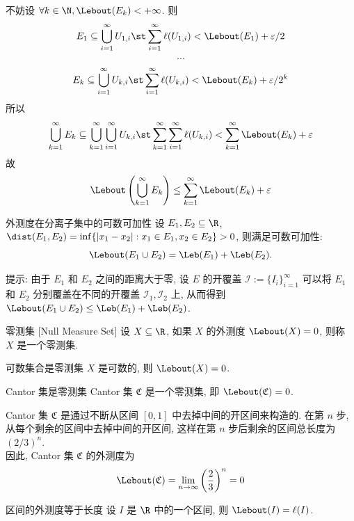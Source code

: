 \begin{prf}
    不妨设 \(\forall k \in \N, \Lebout(E_k)<+\infty\). 则
    \[E_1\subseteq\bigcup_{i=1}^{\infty}U_{1,i} \st \sum_{i=1}^{\infty} \ell(U_{1,i}) < \Lebout(E_1) + \varepsilon/2 \]
    \[\cdots\]
    \[E_k\subseteq\bigcup_{i=1}^{\infty}U_{k,i} \st \sum_{i=1}^{\infty} \ell(U_{k,i}) < \Lebout(E_k) + \varepsilon/2^k \]
    所以
    \[\bigcup_{k=1}^{\infty}E_k \subseteq \bigcup_{k=1}^{\infty}\bigcup_{i=1}^{\infty}U_{k,i} \st \sum_{k=1}^{\infty}\sum_{i=1}^{\infty} \ell(U_{k,i}) < \sum_{k=1}^{\infty} \Lebout(E_k) + \varepsilon\]
    故
    \[\Lebout\left(\bigcup_{k=1}^{\infty}E_k\right) \leq \sum_{k=1}^{\infty} \Lebout(E_k) + \varepsilon\]
\end{prf}
\begin{crl}
    {外测度在分离子集中的可数可加性}
    设 \(E_1,E_2\subseteq\R\), \(\dist(E_1,E_2)=\inf\{|x_1-x_2|:x_1\in E_1,x_2\in E_2\}>0\), 则满足可数可加性: 
    \[\Lebout(E_1\cup E_2)=\Leb(E_1)+\Leb(E_2).\]
\end{crl}
\begin{prf}
    提示: 由于 \(E_1\) 和 \(E_2\) 之间的距离大于零, 设 \(E\) 的开覆盖 \(\mathcal{I}:=\{I_i\}_{i=1}^\infty\) 可以将 \(E_1\) 和 \(E_2\) 分别覆盖在不同的开覆盖 \(\mathcal{I}_1,\mathcal{I}_2\) 上, 从而得到 \(\Lebout(E_1\cup E_2)\leq\Leb(E_1)+\Leb(E_2)\).
\end{prf}
\begin{dfn}
    {零测集}
    [Null Measure Set]
    设 \(X\subseteq\R\), 如果 \(X\) 的外测度 \(\Lebout(X)=0\), 则称 \(X\) 是一个零测集.
\end{dfn}
\begin{ppt}
    {可数集合是零测集}
    \(X\) 是可数的, 则 \(\Lebout(X)=0\).
\end{ppt}
\begin{ins}
    {Cantor 集是零测集}
    Cantor 集 \(\mathfrak{C}\) 是一个零测集, 即 \(\Lebout(\mathfrak{C})=0\).
\end{ins}
\begin{prf}
    Cantor 集 \(\mathfrak{C}\) 是通过不断从区间 \([0,1]\) 中去掉中间的开区间来构造的. 在第 \(n\) 步, 从每个剩余的区间中去掉中间的开区间, 这样在第 \(n\) 步后剩余的区间总长度为 \((2/3)^n\).\\
    因此, Cantor 集 \(\mathfrak{C}\) 的外测度为
    \[\Lebout(\mathfrak{C}) = \lim_{n\to\infty} \qty(\frac{2}{3})^n = 0\]
\end{prf}
\begin{ppt}
    {区间的外测度等于长度}
    设 \(I\) 是 \(\R\) 中的一个区间, 则 \(\Lebout(I)=\ell(I)\).
\end{ppt}
